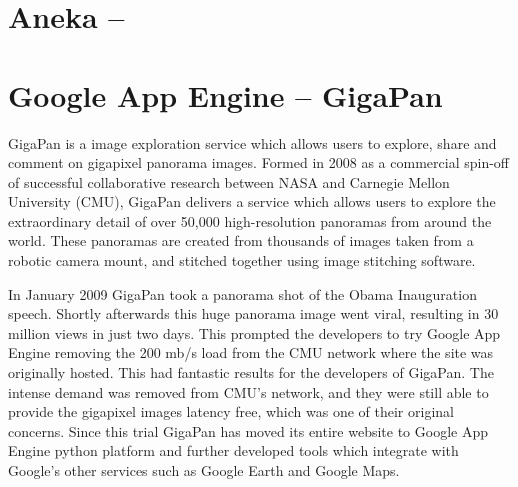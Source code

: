 \section{Aneka -- }

\section{Google App Engine -- GigaPan}
GigaPan is a image exploration service which allows users to explore, share and comment on gigapixel panorama images. Formed in 2008 as a commercial spin-off of successful collaborative research between NASA and Carnegie Mellon University (CMU), GigaPan delivers a service which allows users to explore the extraordinary detail of over 50,000 high-resolution panoramas from around the world. These panoramas are created from thousands of images taken from a robotic camera mount, and stitched together using image stitching software\ftSgaeOne.

In January 2009 GigaPan took a panorama shot of the Obama Inauguration speech. Shortly afterwards this huge panorama image went viral, resulting in 30 million views in just two days. This prompted the developers to try Google App Engine removing the 200 mb/s load from the CMU network where the site was originally hosted. This had fantastic results for the developers of GigaPan. The intense demand was removed from CMU's network, and they were still able to provide the gigapixel images latency free, which was one of their original concerns\ftSgaeTwo. Since this trial GigaPan has moved its entire website to Google App Engine python platform and further developed tools which integrate with Google's other services such as Google Earth and Google Maps\ftSgaeThree.
